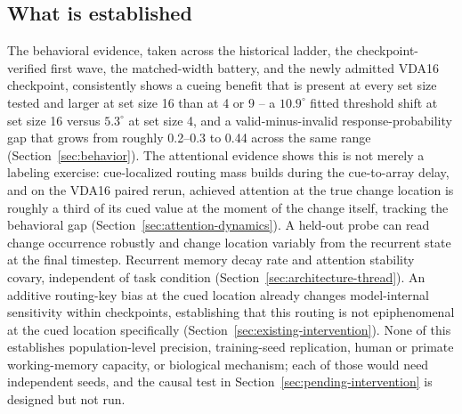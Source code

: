 \documentclass[11pt,a4paper]{article}
\begin{document}
\subsection{What is established}
The behavioral evidence, taken across the historical ladder, the checkpoint-verified first wave, the matched-width battery, and the newly admitted VDA16 checkpoint, consistently shows a cueing benefit that is present at every set size tested and larger at set size 16 than at 4 or 9 -- a $10.9^\circ$ fitted threshold shift at set size 16 versus $5.3^\circ$ at set size 4, and a valid-minus-invalid response-probability gap that grows from roughly 0.2--0.3 to 0.44 across the same range (Section~\ref{sec:behavior}). The attentional evidence shows this is not merely a labeling exercise: cue-localized routing mass builds during the cue-to-array delay, and on the VDA16 paired rerun, achieved attention at the true change location is roughly a third of its cued value at the moment of the change itself, tracking the behavioral gap (Section~\ref{sec:attention-dynamics}). A held-out probe can read change occurrence robustly and change location variably from the recurrent state at the final timestep. Recurrent memory decay rate and attention stability covary, independent of task condition (Section~\ref{sec:architecture-thread}). An additive routing-key bias at the cued location already changes model-internal sensitivity within checkpoints, establishing that this routing is not epiphenomenal at the cued location specifically (Section~\ref{sec:existing-intervention}). None of this establishes population-level precision, training-seed replication, human or primate working-memory capacity, or biological mechanism; each of those would need independent seeds, and the causal test in Section~\ref{sec:pending-intervention} is designed but not run.
\end{document}
